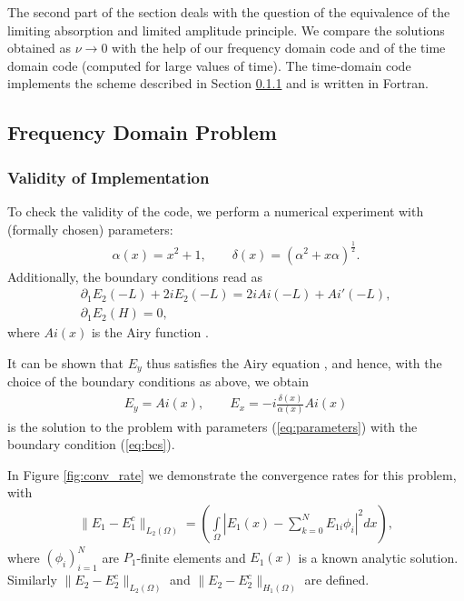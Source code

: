 The second part of the section deals with the question of the equivalence of the limiting absorption and limited amplitude 
principle. We compare the solutions obtained as $\nu\rightarrow 0$ with the help of our frequency domain code 
and of the time domain code (computed for large values of time). 
The time-domain code implements the scheme described in Section \ref{} and 
is written in Fortran. 
\subsection{Frequency Domain Problem}
\subsubsection{Validity of Implementation}
To check the validity of the code, we perform a numerical experiment with (formally chosen) parameters:
\begin{align}
\label{eq:parameters}
\alpha(x)=x^2+1,\qquad \delta(x)=\left(\alpha^2+x\alpha\right)^{\frac{1}{2}}.
\end{align}
Additionally, the boundary conditions read as 
\begin{align}
\label{eq:bcs}
\partial_{1}E_{2}(-L)+2iE_{2}(-L)=2iAi(-L)+Ai'(-L),\\
\partial_{1}E_{2}(H)=0,
\end{align}
where $Ai(x)$ is the Airy function \cite{}.

It can be shown that $E_{y}$ thus satisfies the Airy equation \cite{}, and hence, with the choice of the boundary conditions as above, we obtain  
\begin{align*}
E_{y}=Ai(x),\qquad 
E_{x}=-i\frac{\delta(x)}{\alpha(x)}Ai(x)
\end{align*}
is the solution to the problem with parameters (\ref{eq:parameters}) with the boundary condition (\ref{eq:bcs}).

In Figure \ref{fig:conv_rate} we demonstrate the convergence rates for this problem, with 
\begin{align*}
\|E_{1}-E_{1}^{c}\|_{L_{2}(\Omega)}=\left(\int\limits_{\Omega}\left|E_{1}(x)-\sum\limits_{k=0}^{N}E_{1i}\phi_{i}\right|^2dx\right),
\end{align*}
where $\left(\phi_{i}\right)_{i=1}^{N}$ are $P_{1}$-finite elements and $E_{1}(x)$ is a known analytic solution. Similarly $\|E_{2}-E_{2}^{c}\|_{L_{2}(\Omega)}$ and $\|E_{2}-E_{2}^{c}\|_{H_{1}(\Omega)}$ are defined. 


